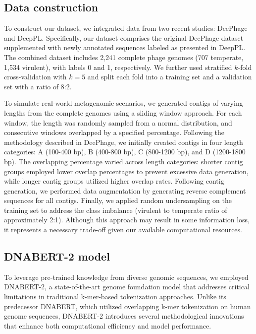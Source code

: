 \documentclass[runningheads]{llncs}
\begin{document}
\subsection{Data construction}\label{data_construction}
To construct our dataset, we integrated data from two recent studies: DeePhage\cite{wu2021deephage} and DeepPL\cite{zhang2024deeppl}. Specifically, our dataset comprises the original DeePhage\cite{wu2021deephage} dataset supplemented with newly annotated sequences labeled as presented in DeepPL\cite{zhang2024deeppl}. The combined dataset includes 2,241 complete phage genomes (707 temperate, 1,534 virulent), with labels 0 and 1, respectively. We further used stratified $k$-fold cross-validation with $k=5$ and split each fold into a training set and a validation set with a ratio of 8:2.

To simulate real-world metagenomic scenarios, we generated contigs of varying lengths from the complete genomes using a sliding window approach. For each window, the length was randomly sampled from a normal distribution, and consecutive windows overlapped by a specified percentage. Following the methodology described in DeePhage\cite{wu2021deephage}, we initially created contigs in four length categories: A (100-400 bp), B (400-800 bp), C (800-1200 bp), and D (1200-1800 bp). The overlapping percentage varied across length categories: shorter contig groups employed lower overlap percentages to prevent excessive data generation, while longer contig groups utilized higher overlap rates. Following contig generation, we performed data augmentation by generating reverse complement sequences for all contigs. Finally, we applied random undersampling on the training set to address the class imbalance (virulent to temperate ratio of approximately 2:1). Although this approach may result in some information loss, it represents a necessary trade-off given our available computational resources.

\subsection{DNABERT-2 model}
To leverage pre-trained knowledge from diverse genomic sequences, we employed DNABERT-2\cite{zhou2023dnabert}, a state-of-the-art genome foundation model that addresses critical limitations in traditional k-mer-based tokenization approaches. Unlike its predecessor DNABERT\cite{ji2021dnabert}, which utilized overlapping k-mer tokenization on human genome sequences, DNABERT-2 introduces several methodological innovations that enhance both computational efficiency and model performance.
\end{document}

